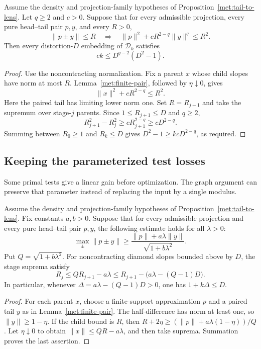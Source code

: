 \begin{theorem}\label{met:power-transfer}
Assume the density and projection-family hypotheses of
Proposition~\ref{met:tail-to-lens}. Let $q\ge2$ and $c>0$. Suppose that
for every admissible projection, every pure head--tail pair $p,y$, and
every $R>0$,
\[
 \|p\pm y\|\le R
 \quad\Longrightarrow\quad
 \|p\|^2+cR^{2-q}\|y\|^q\le R^2.
\]
Then every distortion-$D$ embedding of $\mathcal D_k$ satisfies
\[
 ck\le D^{q-2}(D^2-1).
\]
\end{theorem}
\begin{proof}
Use the noncontracting normalization. Fix a parent $x$ whose child
slopes have norm at most $R$. Lemma~\ref{met:finite-pair}, followed
by $\eta\downarrow0$, gives
\[
 \|x\|^2+cR^{2-q}\le R^2.
\]
Here the paired tail has limiting lower norm one. Set $R=R_{j+1}$
and take the supremum over stage-$j$ parents. Since $1\le R_{j+1}\le D$
and $q\ge2$,
\[
 R_{j+1}^2-R_j^2\ge cR_{j+1}^{2-q}\ge cD^{2-q}.
\]
Summing between $R_0\ge1$ and $R_k\le D$ gives
$D^2-1\ge kcD^{2-q}$, as required.
\end{proof}

\subsection{Keeping the parameterized test losses}\label{met:parametric-section}
Some primal tests give a linear gain before optimization. The graph
argument can preserve that parameter instead of replacing the input by a
single modulus.

\begin{proposition}\label{met:parametric}
Assume the density and projection-family hypotheses of
Proposition~\ref{met:tail-to-lens}. Fix constants $a,b>0$. Suppose that
for every admissible projection and every pure head--tail pair $p,y$,
the following estimate holds for all $\lambda>0$:
\[
 \max_\pm\|p\pm y\|\ge
 \frac{\|p\|+a\lambda\|y\|}{\sqrt{1+b\lambda^2}}.
\]
Put $Q=\sqrt{1+b\lambda^2}$. For noncontracting diamond slopes
bounded above by $D$, the stage suprema satisfy
\[
 R_j\le Q R_{j+1}-a\lambda
 \le R_{j+1}-\bigl(a\lambda-(Q-1)D\bigr).
\]
In particular, whenever $\Delta=a\lambda-(Q-1)D>0$, one has
$1+k\Delta\le D$.
\end{proposition}
\begin{proof}
For each parent $x$, choose a finite-support approximation $p$ and a
paired tail $y$ as in Lemma~\ref{met:finite-pair}. The half-difference
has norm at least one, so $\|y\|\ge1-\eta$. If the child bound is
$R$, then $R+2\eta\ge(\|p\|+a\lambda(1-\eta))/Q$.
Let $\eta\downarrow0$ to obtain $\|x\|\le QR-a\lambda$,
and then take suprema. Summation proves the last assertion.
\end{proof}

